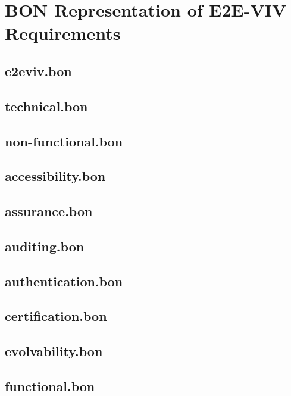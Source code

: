 \chapter{BON Representation of E2E-VIV Requirements}

\section{e2eviv.bon}

\section{technical.bon}

\section{non-functional.bon}

\section{accessibility.bon}

\section{assurance.bon}

\section{auditing.bon}

\section{authentication.bon}

\section{certification.bon}

\section{evolvability.bon}

\section{functional.bon}

